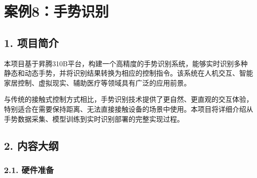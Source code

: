 \chapter{案例8：手势识别}\label{ux6848ux4f8b8ux624bux52bfux8bc6ux522b}

\section{1. 项目简介}\label{ux9879ux76eeux7b80ux4ecb}

本项目基于昇腾310B平台，构建一个高精度的手势识别系统，能够实时识别多种静态和动态手势，并将识别结果转换为相应的控制指令。该系统在人机交互、智能家居控制、虚拟现实、辅助医疗等领域具有广泛的应用前景。

与传统的接触式控制方式相比，手势识别技术提供了更自然、更直观的交互体验，特别适合在需要保持距离、无法直接接触设备的场景中使用。本项目将详细介绍从手势数据采集、模型训练到实时识别部署的完整实现过程。

\section{2. 内容大纲}\label{ux5185ux5bb9ux5927ux7eb2}

\subsection{2.1. 硬件准备}\label{ux786cux4ef6ux51c6ux5907}

